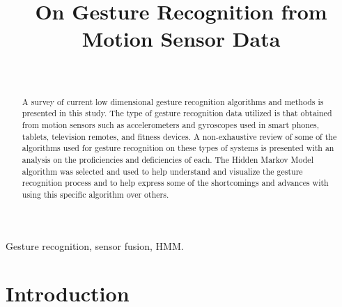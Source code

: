 \documentclass[conference]{IEEEtran}
\begin{document}
\title{On Gesture Recognition from Motion Sensor Data}

\author{
\\
}

\maketitle

\begin{abstract}

A survey of current low dimensional gesture recognition algorithms and methods is presented in this study. The type of gesture recognition data utilized is that obtained from motion sensors such as accelerometers and gyroscopes used in smart phones, tablets, television remotes, and fitness devices. A non-exhaustive review of some of the algorithms used for gesture recognition on these types of systems is presented with an analysis on the proficiencies and deficiencies of each. The Hidden Markov Model algorithm was selected and used to help understand and visualize the gesture recognition process and to help express some of the shortcomings and advances with using this specific algorithm over others.
 
\end{abstract}
\hfill

\begin{IEEEkeywords}
Gesture recognition, sensor fusion, HMM.
\end{IEEEkeywords}

\section{Introduction}

\end{document}

